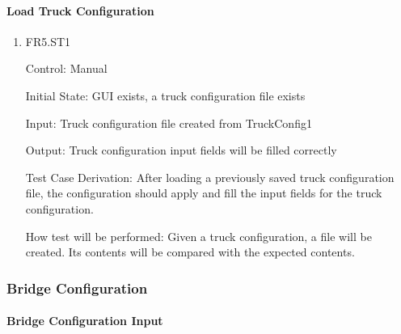 \documentclass[12pt, titlepage]{article}
\begin{document}
\paragraph{Load Truck Configuration}

\begin{enumerate}

  \item{FR5.ST1\\}

  Control: Manual

  Initial State: GUI exists, a truck configuration file exists

  Input: Truck configuration file created from TruckConfig1

  Output: Truck configuration input fields will be filled correctly

  Test Case Derivation: After loading a previously saved truck configuration file, the configuration
  should apply and fill the input fields for the truck configuration.

  How test will be performed: Given a truck configuration, a file will be created. Its contents
  will be compared with the expected contents.

\end{enumerate}

\subsubsection{Bridge Configuration}

\paragraph{Bridge Configuration Input}
\end{document}
